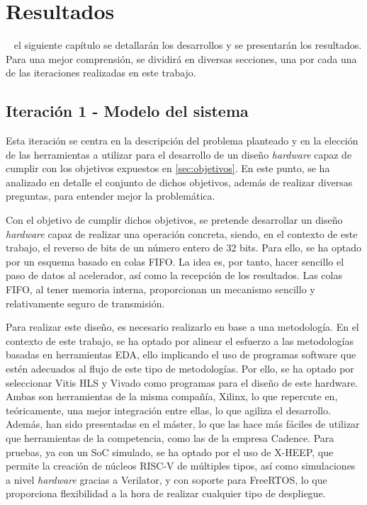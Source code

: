 \chapter{Resultados}

\vspace{-30pt}

~ el siguiente capítulo se detallarán los desarrollos y se presentarán los resultados. Para una mejor comprensión, se dividirá en diversas secciones, una por cada una de las iteraciones realizadas en este trabajo.

\section{Iteración 1 - Modelo del sistema}
\label{res:iteracion1}
Esta iteración se centra en la descripción del problema planteado y en la elección de las herramientas a utilizar para el desarrollo de un diseño \textit{hardware} capaz de cumplir con los objetivos expuestos en \ref{sec:objetivos}. En este punto, se ha analizado en detalle el conjunto de dichos objetivos, además de realizar diversas preguntas, para entender mejor la problemática.

Con el objetivo de cumplir dichos objetivos, se pretende desarrollar un diseño \textit{hardware} capaz de realizar una operación concreta, siendo, en el contexto de este trabajo, el reverso de bits de un número entero de 32 bits. Para ello, se ha optado por un esquema basado en colas \ac{FIFO}. La idea es, por tanto, hacer sencillo el paso de datos al acelerador, así como la recepción de los resultados. Las colas FIFO, al tener memoria interna, proporcionan un mecanismo sencillo y relativamente seguro de transmisión.

Para realizar este diseño, es necesario realizarlo en base a una metodología. En el contexto de este trabajo, se ha optado por alinear el esfuerzo a las metodologías basadas en herramientas EDA, ello implicando el uso de programas software que estén adecuados al flujo de este tipo de metodologías. Por ello, se ha optado por seleccionar Vitis HLS y Vivado como programas para el diseño de este hardware. Ambas son herramientas de la misma compañía, Xilinx, lo que repercute en, teóricamente, una mejor integración entre ellas, lo que agiliza el desarrollo. Además, han sido presentadas en el máster, lo que las hace más fáciles de utilizar que herramientas de la competencia, como las de la empresa Cadence. Para pruebas, ya con un SoC simulado, se ha optado por el uso de X-HEEP, que permite la creación de núcleos RISC-V de múltiples tipos, así como simulaciones a nivel \textit{hardware} gracias a Verilator, y con soporte para FreeRTOS, lo que proporciona flexibilidad a la hora de realizar cualquier tipo de despliegue.


